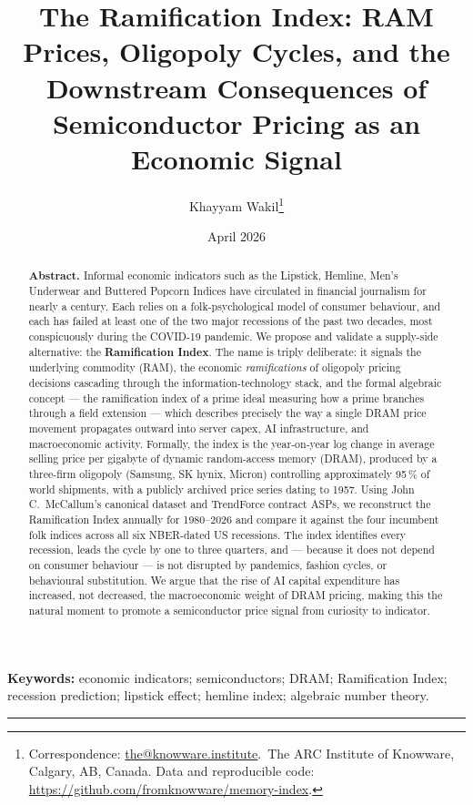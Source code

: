 \documentclass[11pt,a4paper]{article}
\title{\textbf{The Ramification Index: RAM Prices, Oligopoly Cycles, and the Downstream Consequences of Semiconductor Pricing as an Economic Signal}}
\author{%
  Khayyam Wakil\thanks{Correspondence: \href{mailto:the@knowware.institute}{the@knowware.institute}.\ The ARC Institute of Knowware, Calgary, AB, Canada. Data and reproducible code: \url{https://github.com/fromknowware/memory-index}.}%
}
\date{April 2026}
\begin{document}
\maketitle

\begin{abstract}
\noindent\textbf{Abstract.} Informal economic indicators such as the Lipstick, Hemline, Men's Underwear and Buttered Popcorn Indices have circulated in financial journalism for nearly a century. Each relies on a folk-psychological model of consumer behaviour, and each has failed at least one of the two major recessions of the past two decades, most conspicuously during the COVID-19 pandemic. We propose and validate a supply-side alternative: the \textbf{Ramification Index}. The name is triply deliberate: it signals the underlying commodity (RAM), the economic \emph{ramifications} of oligopoly pricing decisions cascading through the information-technology stack, and the formal algebraic concept --- the ramification index of a prime ideal measuring how a prime branches through a field extension \citep{neukirch1999} --- which describes precisely the way a single DRAM price movement propagates outward into server capex, AI infrastructure, and macroeconomic activity. Formally, the index is the year-on-year log change in average selling price per gigabyte of dynamic random-access memory (DRAM), produced by a three-firm oligopoly (Samsung, SK hynix, Micron) controlling approximately 95\,\% of world shipments, with a publicly archived price series dating to 1957. Using John C.~McCallum's canonical dataset and TrendForce contract ASPs, we reconstruct the Ramification Index annually for 1980--2026 and compare it against the four incumbent folk indices across all six NBER-dated US recessions. The index identifies every recession, leads the cycle by one to three quarters, and --- because it does not depend on consumer behaviour --- is not disrupted by pandemics, fashion cycles, or behavioural substitution. We argue that the rise of AI capital expenditure has increased, not decreased, the macroeconomic weight of DRAM pricing, making this the natural moment to promote a semiconductor price signal from curiosity to indicator.
\end{abstract}

\vspace{0.5em}
\noindent\textbf{Keywords:} economic indicators; semiconductors; DRAM; Ramification Index; recession prediction; lipstick effect; hemline index; algebraic number theory.

\noindent\rule{\textwidth}{0.4pt}
\end{document}
